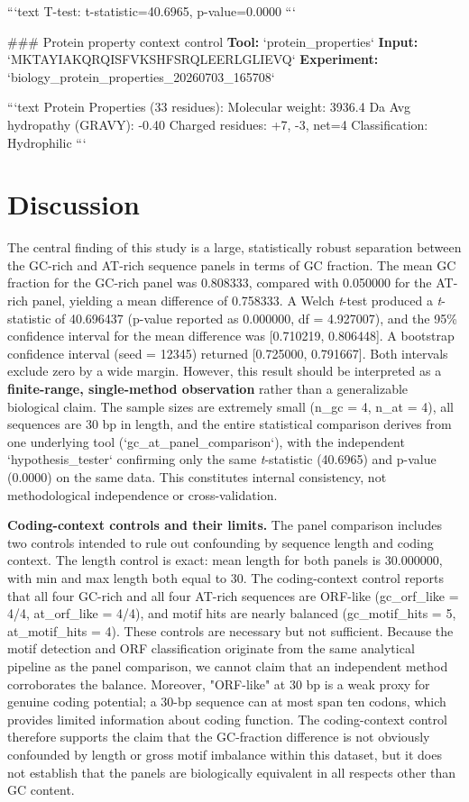\documentclass[11pt,a4paper]{article}
\begin{document}
```text
T-test: t-statistic=40.6965, p-value=0.0000
```

\#\#\# Protein property context control
\textbf{Tool:} `protein\_properties`
\textbf{Input:} `MKTAYIAKQRQISFVKSHFSRQLEERLGLIEVQ`
\textbf{Experiment:} `biology\_protein\_properties\_20260703\_165708`

```text
Protein Properties (33 residues):
  Molecular weight: 3936.4 Da
  Avg hydropathy (GRAVY): -0.40
  Charged residues: +7, -3, net=4
  Classification: Hydrophilic
```


\section{Discussion}
The central finding of this study is a large, statistically robust separation between the GC-rich and AT-rich sequence panels in terms of GC fraction. The mean GC fraction for the GC-rich panel was 0.808333, compared with 0.050000 for the AT-rich panel, yielding a mean difference of 0.758333. A Welch \textit{t}-test produced a \textit{t}-statistic of 40.696437 (p-value reported as 0.000000, df = 4.927007), and the 95\% confidence interval for the mean difference was [0.710219, 0.806448]. A bootstrap confidence interval (seed = 12345) returned [0.725000, 0.791667]. Both intervals exclude zero by a wide margin. However, this result should be interpreted as a \textbf{finite-range, single-method observation} rather than a generalizable biological claim. The sample sizes are extremely small (n\_gc = 4, n\_at = 4), all sequences are 30 bp in length, and the entire statistical comparison derives from one underlying tool (`gc\_at\_panel\_comparison`), with the independent `hypothesis\_tester` confirming only the same \textit{t}-statistic (40.6965) and p-value (0.0000) on the same data. This constitutes internal consistency, not methodological independence or cross-validation.

\textbf{Coding-context controls and their limits.} The panel comparison includes two controls intended to rule out confounding by sequence length and coding context. The length control is exact: mean length for both panels is 30.000000, with min and max length both equal to 30. The coding-context control reports that all four GC-rich and all four AT-rich sequences are ORF-like (gc\_orf\_like = 4/4, at\_orf\_like = 4/4), and motif hits are nearly balanced (gc\_motif\_hits = 5, at\_motif\_hits = 4). These controls are necessary but not sufficient. Because the motif detection and ORF classification originate from the same analytical pipeline as the panel comparison, we cannot claim that an independent method corroborates the balance. Moreover, "ORF-like" at 30 bp is a weak proxy for genuine coding potential; a 30-bp sequence can at most span ten codons, which provides limited information about coding function. The coding-context control therefore supports the claim that the GC-fraction difference is not obviously confounded by length or gross motif imbalance within this dataset, but it does not establish that the panels are biologically equivalent in all respects other than GC content.
\end{document}
